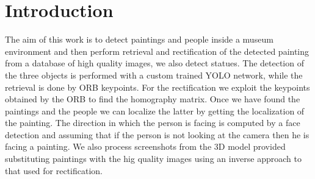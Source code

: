 \section{Introduction}
The aim of this work is to detect paintings and people inside a museum environment and then perform retrieval and rectification of the detected painting from a database of high quality images, we also detect statues. The detection of the three objects is performed with a custom trained YOLO network, while the retrieval is done by ORB keypoints. For the rectification we exploit the keypoints obtained by the ORB to find the homography matrix. Once we have found the paintings and the people we can localize the latter by getting the localization of the painting. The direction in which the person is facing is computed by a face detection and assuming that if the person is not looking at the camera then he is facing a painting. We also process screenshots from the 3D model provided substituting paintings with the hig quality images using an inverse approach to that used for rectification.
